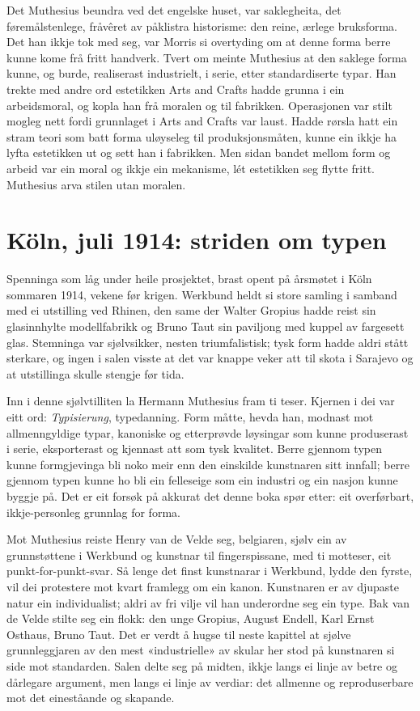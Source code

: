 Det Muthesius beundra ved det engelske huset, var saklegheita, det føremålstenlege, fråvêret av påklistra historisme: den reine, ærlege bruksforma. Det han ikkje tok med seg, var Morris si overtyding om at denne forma berre kunne kome frå fritt handverk. Tvert om meinte Muthesius at den saklege forma kunne, og burde, realiserast industrielt, i serie, etter standardiserte typar. Han trekte med andre ord estetikken Arts and Crafts hadde grunna i ein arbeidsmoral, og kopla han frå moralen og til fabrikken. Operasjonen var stilt mogleg nett fordi grunnlaget i Arts and Crafts var laust. Hadde rørsla hatt ein stram teori som batt forma uløyseleg til produksjonsmåten, kunne ein ikkje ha lyfta estetikken ut og sett han i fabrikken. Men sidan bandet mellom form og arbeid var ein moral og ikkje ein mekanisme, lét estetikken seg flytte fritt. Muthesius arva stilen utan moralen.

\section{Köln, juli 1914: striden om typen}

Spenninga som låg under heile prosjektet, brast opent på årsmøtet i Köln sommaren 1914, vekene før krigen. Werkbund heldt si store samling i samband med ei utstilling ved Rhinen, den same der Walter Gropius hadde reist sin glasinnhylte modellfabrikk og Bruno Taut sin paviljong med kuppel av fargesett glas. Stemninga var sjølvsikker, nesten triumfalistisk; tysk form hadde aldri stått sterkare, og ingen i salen visste at det var knappe veker att til skota i Sarajevo og at utstillinga skulle stengje før tida.

Inn i denne sjølvtilliten la Hermann Muthesius fram ti teser. Kjernen i dei var eitt ord: \emph{Typisierung}, typedanning. Form måtte, hevda han, modnast mot allmenngyldige typar, kanoniske og etterprøvde løysingar som kunne produserast i serie, eksporterast og kjennast att som tysk kvalitet. Berre gjennom typen kunne formgjevinga bli noko meir enn den einskilde kunstnaren sitt innfall; berre gjennom typen kunne ho bli ein felleseige som ein industri og ein nasjon kunne byggje på. Det er eit forsøk på akkurat det denne boka spør etter: eit overførbart, ikkje-personleg grunnlag for forma.

Mot Muthesius reiste Henry van de Velde seg, belgiaren, sjølv ein av grunnstøttene i Werkbund og kunstnar til fingerspissane, med ti motteser, eit punkt-for-punkt-svar. Så lenge det finst kunstnarar i Werkbund, lydde den fyrste, vil dei protestere mot kvart framlegg om ein kanon. Kunstnaren er av djupaste natur ein individualist; aldri av fri vilje vil han underordne seg ein type. Bak van de Velde stilte seg ein flokk: den unge Gropius, August Endell, Karl Ernst Osthaus, Bruno Taut. Det er verdt å hugse til neste kapittel at sjølve grunnleggjaren av den mest «industrielle» av skular her stod på kunstnaren si side mot standarden. Salen delte seg på midten, ikkje langs ei linje av betre og dårlegare argument, men langs ei linje av verdiar: det allmenne og reproduserbare mot det eineståande og skapande.

